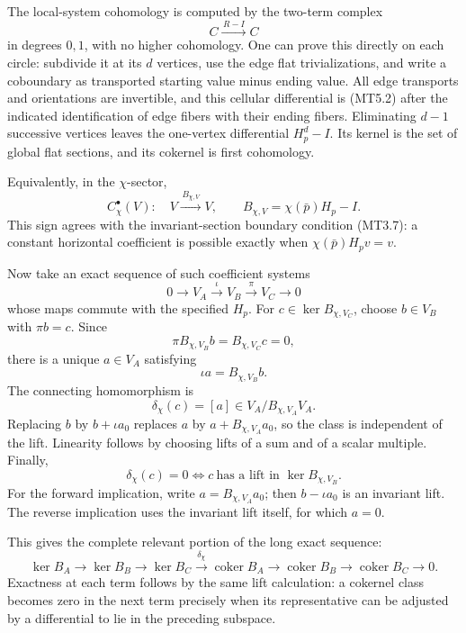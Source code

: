 The local-system cohomology is computed by the two-term complex \[
 C\xrightarrow{\,R-I\,}C
\tag{MT5.2}
\] in degrees \(0,1\), with no higher cohomology. One can prove this
directly on each circle: subdivide it at its \(d\) vertices, use the
edge flat trivializations, and write a coboundary as transported
starting value minus ending value. All edge transports and orientations
are invertible, and this cellular differential is (MT5.2) after the
indicated identification of edge fibers with their ending fibers.
Eliminating \(d-1\) successive vertices leaves the one-vertex
differential \(H_p^d-I\). Its kernel is the set of global flat sections,
and its cokernel is first cohomology.

Equivalently, in the \(\chi\)-sector, \[
 C_\chi^\bullet(V):
 \quad V\xrightarrow{\,B_{\chi,V}\,}V,\qquad
 B_{\chi,V}=\chi(\bar p)H_p-I.
\tag{MT5.3}
\] This sign agrees with the invariant-section boundary condition
(MT3.7): a constant horizontal coefficient is possible exactly when
\(\chi(\bar p)H_p v=v\).

Now take an exact sequence of such coefficient systems \[
 0\longrightarrow V_A\xrightarrow{\iota}V_B
       \xrightarrow{\pi}V_C\longrightarrow0
\tag{MT5.4}
\] whose maps commute with the specified \(H_p\). For
\(c\in\ker B_{\chi,V_C}\), choose \(b\in V_B\) with \(\pi b=c\). Since
\[
 \pi B_{\chi,V_B}b
    =B_{\chi,V_C}c=0,
\] there is a unique \(a\in V_A\) satisfying \[
 \iota a=B_{\chi,V_B}b.
\] The connecting homomorphism is \[
 \boxed{\delta_\chi(c)=[a]\in
       V_A/B_{\chi,V_A}V_A.}
\tag{MT5.5}
\] Replacing \(b\) by \(b+\iota a_0\) replaces \(a\) by
\(a+B_{\chi,V_A}a_0\), so the class is independent of the lift.
Linearity follows by choosing lifts of a sum and of a scalar multiple.
Finally, \[
 \delta_\chi(c)=0
 \iff c\ \text{has a lift in }\ker B_{\chi,V_B}.
\tag{MT5.6}
\] For the forward implication, write \(a=B_{\chi,V_A}a_0\); then
\(b-\iota a_0\) is an invariant lift. The reverse implication uses the
invariant lift itself, for which \(a=0\).

This gives the complete relevant portion of the long exact sequence: \[
 \ker B_A\longrightarrow\ker B_B\longrightarrow\ker B_C
 \xrightarrow{\delta_\chi}
 \operatorname{coker}B_A\longrightarrow
 \operatorname{coker}B_B\longrightarrow
 \operatorname{coker}B_C\longrightarrow0.
\tag{MT5.7}
\] Exactness at each term follows by the same lift calculation: a
cokernel class becomes zero in the next term precisely when its
representative can be adjusted by a differential to lie in the preceding
subspace.


